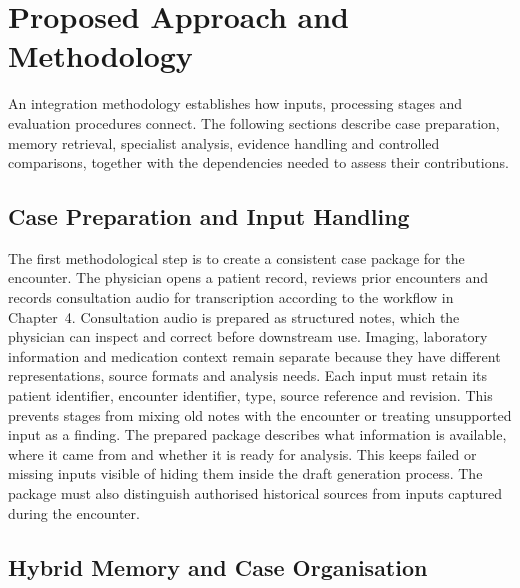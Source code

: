 \begingroup
\renewcommand{\encodingdefault}{T1}
\selectfont
\chapter{Proposed Approach and Methodology}

An integration methodology establishes how inputs, processing stages and evaluation procedures connect. The following sections describe case preparation, memory retrieval, specialist analysis, evidence handling and controlled comparisons, together with the dependencies needed to assess their contributions.

\section{Case Preparation and Input Handling}

The first methodological step is to create a consistent case package for the encounter. The physician opens a patient record, reviews prior encounters and records consultation audio for transcription according to the workflow in Chapter~4. Consultation audio is prepared as structured notes, which the physician can inspect and correct before downstream use. Imaging, laboratory information and medication context remain separate because they have different representations, source formats and analysis needs. Each input must retain its patient identifier, encounter identifier, type, source reference and revision. This prevents stages from mixing old notes with the encounter or treating unsupported input as a finding. The prepared package describes what information is available, where it came from and whether it is ready for analysis. This keeps failed or missing inputs visible of hiding them inside the draft generation process. The package must also distinguish authorised historical sources from inputs captured during the encounter.

\section{Hybrid Memory and Case Organisation}

